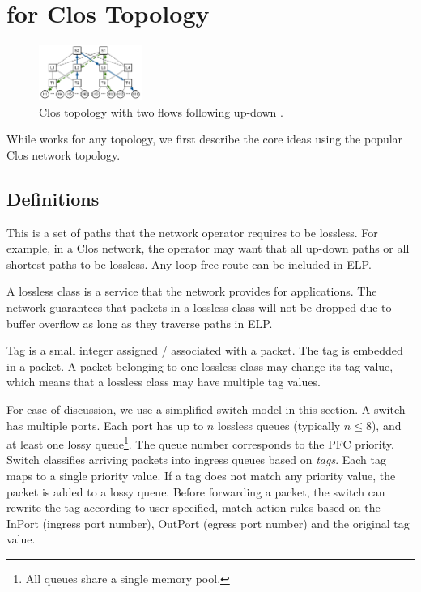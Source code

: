 \section{\sysname{} for Clos Topology}
\label{sec:specific}

\begin{figure}[t]
		\centering
		\includegraphics[width=0.3\textwidth] {figs/updown_paths}
		\vspace{-1em}
		\caption{Clos topology with two flows following up-down .}
		\vspace{-1em}
		\label{fig:basic_clos}
\end{figure}

While \sysname{} works for any topology, we first describe the core ideas using
the popular Clos network topology.

\subsection {Definitions}

 This is a set of paths that the network
operator requires to be lossless. For example, in a Clos network, the operator
may want that all up-down paths or all shortest paths to be lossless.  Any
loop-free route can be included in ELP.

 A lossless class is a service that the network provides for
applications. The network guarantees that packets in a lossless class will not
be dropped due to buffer overflow as long as they traverse paths in ELP.

 Tag is a small integer assigned / associated with a packet. The tag
is embedded in a packet. A packet belonging to one lossless class may change its
tag value, which means that a lossless class may have multiple tag values.

 For ease of discussion, we use a simplified
switch model in this section.  A switch has multiple ports. Each port
has up to $n$ lossless queues (typically $n\leq8$), and at least one
lossy queue\footnote{All queues share a single memory pool.}. The queue
number corresponds to the PFC priority. Switch classifies arriving
packets into ingress queues based on {\em tags}. Each tag maps to a
single priority value. If a tag does not match any priority value, the
packet is added to a lossy queue. Before forwarding a packet, the
switch can rewrite the tag according to user-specified, match-action
rules based on the InPort (ingress port number), OutPort (egress port number)
and the original tag value.

